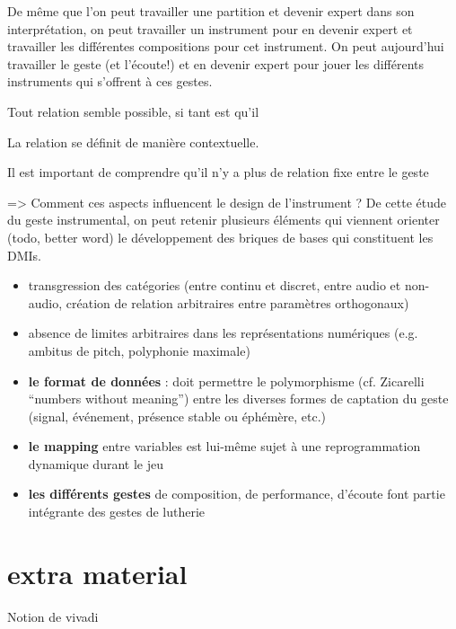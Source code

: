 De même que l'on peut travailler une partition et devenir expert dans son interprétation, on peut travailler un instrument pour en devenir expert et travailler les différentes compositions pour cet instrument. On peut aujourd'hui travailler le geste (et l'écoute!) et en devenir expert pour jouer les différents instruments qui s'offrent à ces gestes.


Tout relation semble possible, si tant est qu'il


La relation se définit de manière contextuelle. 

Il est important de comprendre qu'il n'y a plus de relation fixe entre le geste



=> Comment ces aspects influencent le design de l’instrument ?
De cette étude du geste instrumental, on peut retenir plusieurs éléments qui viennent orienter (todo, better word) le développement des briques de bases qui constituent les DMIs.

\vspace{-1em}
\begin{itemize}[noitemsep]
\item transgression des catégories (entre continu et discret, entre audio et non-audio, création de relation arbitraires entre paramètres orthogonaux)
\item absence de limites arbitraires dans les représentations numériques (e.g. ambitus de pitch, polyphonie maximale)
\end{itemize}

\vspace{-1em}
\begin{itemize}[noitemsep]
\item \textbf{le format de données} : doit permettre le polymorphisme (cf. Zicarelli ``numbers without meaning'') entre les diverses formes de captation du geste (signal, événement, présence stable ou éphémère, etc.)
\item \textbf{le mapping} entre variables est lui-même sujet à une reprogrammation dynamique durant le jeu
\item \textbf{les différents gestes} de composition, de performance, d'écoute font partie intégrante des gestes de lutherie
\end{itemize}







\section*{extra material}
Notion de vivadi

